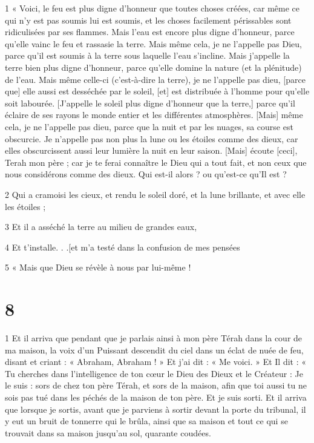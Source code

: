 \par 1 « Voici, le feu est plus digne d'honneur que toutes choses créées, car même ce qui n'y est pas soumis lui est soumis, et les choses facilement périssables sont ridiculisées par ses flammes. Mais l’eau est encore plus digne d’honneur, parce qu’elle vainc le feu et rassasie la terre. Mais même cela, je ne l'appelle pas Dieu, parce qu'il est soumis à la terre sous laquelle l'eau s'incline. Mais j’appelle la terre bien plus digne d’honneur, parce qu’elle domine la nature (et la plénitude) de l’eau. Mais même celle-ci (c'est-à-dire la terre), je ne l'appelle pas dieu, [parce que] elle aussi est desséchée par le soleil, [et] est distribuée à l'homme pour qu'elle soit labourée. [J'appelle le soleil plus digne d'honneur que la terre,] parce qu'il éclaire de ses rayons le monde entier et les différentes atmosphères. [Mais] même cela, je ne l'appelle pas dieu, parce que la nuit et par les nuages, sa course est obscurcie. Je n'appelle pas non plus la lune ou les étoiles comme des dieux, car elles obscurcissent aussi leur lumière la nuit en leur saison. [Mais] écoute [ceci], Terah mon père ; car je te ferai connaître le Dieu qui a tout fait, et non ceux que nous considérons comme des dieux. Qui est-il alors ? ou qu'est-ce qu'Il est ?

\par 2 Qui a cramoisi les cieux, et rendu le soleil doré, et la lune brillante, et avec elle les étoiles ;

\par 3 Et il a asséché la terre au milieu de grandes eaux,

\par 4 Et t'installe. . .[et m'a testé dans la confusion de mes pensées

\par 5 « Mais que Dieu se révèle à nous par lui-même !

\chapter{8}

\par 1 Et il arriva que pendant que je parlais ainsi à mon père Térah dans la cour de ma maison, la voix d'un Puissant descendit du ciel dans un éclat de nuée de feu, disant et criant : « Abraham, Abraham ! » Et j’ai dit : « Me voici. » Et Il dit : « Tu cherches dans l’intelligence de ton cœur le Dieu des Dieux et le Créateur : Je le suis : sors de chez ton père Térah, et sors de la maison, afin que toi aussi tu ne sois pas tué dans les péchés de la maison de ton père. Et je suis sorti. Et il arriva que lorsque je sortis, avant que je parviens à sortir devant la porte du tribunal, il y eut un bruit de tonnerre qui le brûla, ainsi que sa maison et tout ce qui se trouvait dans sa maison jusqu'au sol, quarante coudées.

